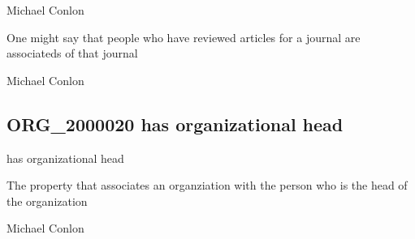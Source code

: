 \documentclass[letterpaper,10pt,english]{sphinxmanual}
\begin{document}
\begin{sphinxShadowBox}

\sphinxAtStartPar
Michael Conlon 
\end{sphinxShadowBox}

\begin{sphinxShadowBox}

\sphinxAtStartPar
One might say that people who have reviewed articles for a journal are associateds of that journal
\end{sphinxShadowBox}

\begin{sphinxShadowBox}

\sphinxAtStartPar
Michael Conlon 
\end{sphinxShadowBox}
\begin{quote}

\ignorespaces \end{quote}


\subsection{ORG\_2000020 \sphinxhyphen{} has organizational head}
\label{\detokenize{doc-ORG_2000020:org-2000020-has-organizational-head}}\label{\detokenize{doc-ORG_2000020:index-0}}\label{\detokenize{doc-ORG_2000020::doc}}
\begin{sphinxShadowBox}

\sphinxAtStartPar
has organizational head
\end{sphinxShadowBox}

\begin{sphinxShadowBox}

\sphinxAtStartPar
The property that associates an organziation with the person who is the head of the organization
\end{sphinxShadowBox}

\begin{sphinxShadowBox}

\sphinxAtStartPar
Michael Conlon 
\end{sphinxShadowBox}
\end{document}
